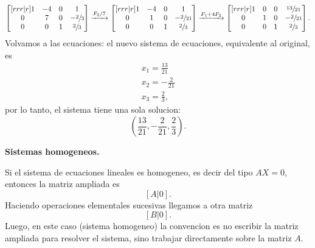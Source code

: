 \documentclass{article}
\theoremstyle{definition}
\theoremstyle{definition}
\theoremstyle{remark}
\begin{document}
\[
\begin{bmatrix}[rrr|r]
  1 & -4 & 0 & 1 \\
  0 & 7 & 0 & -\sfrac{2}{3} \\
  0 &  0 & 1 & \sfrac{2}{3} 
\end{bmatrix}
\xrightarrow{F_2/7} 
\begin{bmatrix}[rrr|r]
  1 & -4 & 0 & 1 \\
  0 & 1 & 0 & -\sfrac{2}{21} \\
  0 &  0 & 1 & \sfrac{2}{3} 
\end{bmatrix}
\xrightarrow{F_1+4F_2}
\begin{bmatrix}[rrr|r]
  1 & 0 & 0 & \sfrac{13}{21} \\
  0 & 1 & 0 & -\sfrac{2}{21} \\
  0 &  0 & 1 & \sfrac{2}{3} 
\end{bmatrix}.
\]
Volvamos a las ecuaciones: el nuevo sistema de ecuaciones, equivalente al original, es \[
  \begin{matrix}
    x_1=\frac{13}{21}\\
    x_2=-\frac{2}{21}\\
    x_3=\frac{2}{3},
  \end{matrix}
\]
por lo tanto, el sistema tiene una sola solucion: \[
  \left(\frac{13}{21},-\frac{2}{21},\frac{2}{3}\right).
\]
\begin{center}
\textbf{Sistemas homogeneos.}
\end{center}
Si el sistema de ecuaciones lineales es homogeneo, es decir del tipo $AX=0$, entonces la matriz ampliada es \[[A|0].\] Haciendo operaciones elementales sucesivas llegamos a otra matriz \[
[B|0].
\]
Luego, en este caso (sistema homogeneo) la convencion es no escribir la matriz ampliada para resolver el sistema, sino trabajar directamente sobre la matriz $A$.
\pagebreak
\end{document}
